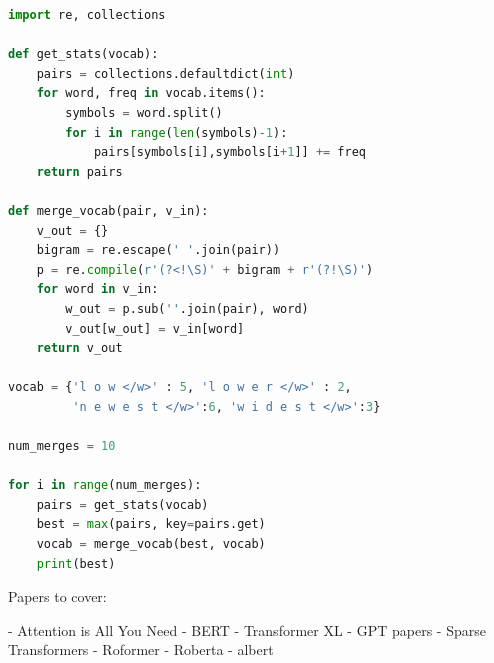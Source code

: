 \documentclass[11pt]{article}
\theoremstyle{definition}
\begin{document}
\begin{lstlisting}[language=Python, caption=Byte-Pair Encoding]
import re, collections

def get_stats(vocab):
    pairs = collections.defaultdict(int)
    for word, freq in vocab.items():
        symbols = word.split()
        for i in range(len(symbols)-1):
            pairs[symbols[i],symbols[i+1]] += freq
    return pairs

def merge_vocab(pair, v_in):
    v_out = {}
    bigram = re.escape(' '.join(pair))
    p = re.compile(r'(?<!\S)' + bigram + r'(?!\S)')
    for word in v_in:
        w_out = p.sub(''.join(pair), word)
        v_out[w_out] = v_in[word]
    return v_out

vocab = {'l o w </w>' : 5, 'l o w e r </w>' : 2,
         'n e w e s t </w>':6, 'w i d e s t </w>':3}

num_merges = 10

for i in range(num_merges):
    pairs = get_stats(vocab)
    best = max(pairs, key=pairs.get)
    vocab = merge_vocab(best, vocab)
    print(best)

\end{lstlisting}

Papers to cover:

- Attention is All You Need
- BERT
- Transformer XL
- GPT papers
- Sparse Transformers
- Roformer
- Roberta
- albert

\end{document}
